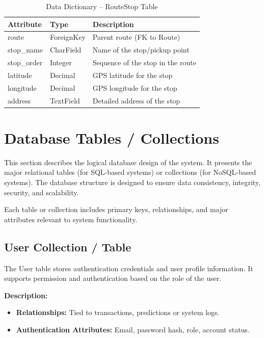 \begin{table}[H]
\centering
\caption{Data Dictionary – RouteStop Table}
\renewcommand{\arraystretch}{1.5}
\begin{tabular}{|p{3cm}|p{3cm}|p{7cm}|}
\hline
\textbf{Attribute} & \textbf{Type} & \textbf{Description} \\
\hline
route & ForeignKey & Parent route (FK to Route) \\
\hline
stop\_name & CharField & Name of the stop/pickup point \\
\hline
stop\_order & Integer & Sequence of the stop in the route \\
\hline
latitude & Decimal & GPS latitude for the stop \\
\hline
longitude & Decimal & GPS longitude for the stop \\
\hline
address & TextField & Detailed address of the stop \\
\hline
\end{tabular}
\end{table}

\section{Database Tables / Collections}

This section describes the logical database design of the system. It presents the major relational tables (for SQL-based systems) or collections (for NoSQL-based systems). The database structure is designed to ensure data consistency, integrity, security, and scalability.

Each table or collection includes primary keys, relationships, and major attributes relevant to system functionality.

\subsection{User Collection / Table}

The User table stores authentication credentials and user profile information. It supports permission and authentication based on the role of the user.

\textbf{Description:}
\begin{itemize}
    \item \textbf{Relationships:} Tied to transactions, predictions or system logs.
    \item \textbf{Authentication Attributes:} Email, password hash, role, account status.
\end{itemize}

